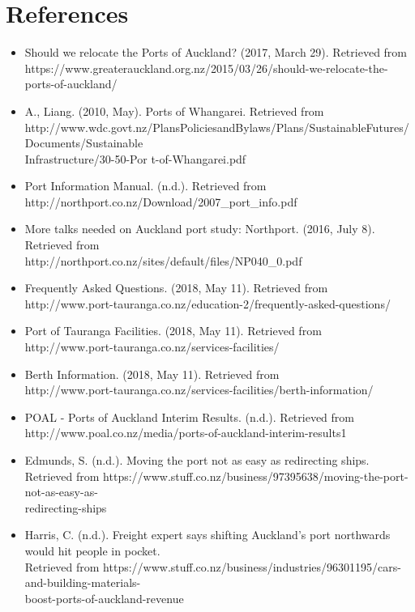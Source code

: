 \newpage
\section{References}

\vspace{5mm}

\begin{itemize}[noitemsep]
    \item Should we relocate the Ports of Auckland? (2017, March 29). Retrieved from \\https://www.greaterauckland.org.nz/2015/03/26/should-we-relocate-the-ports-of-auckland/
    \item A., Liang. (2010, May). Ports of Whangarei. Retrieved from \\http://www.wdc.govt.nz/PlansPoliciesandBylaws/Plans/SustainableFutures/Documents/Sustainable \\Infrastructure/30-50-Por t-of-Whangarei.pdf
    \item Port Information Manual. (n.d.). Retrieved from \\http://northport.co.nz/Download/2007\_port\_info.pdf
    \item More talks needed on Auckland port study: Northport. (2016, July 8). Retrieved from \\http://northport.co.nz/sites/default/files/NP040\_0.pdf
    \item Frequently Asked Questions. (2018, May 11). Retrieved from \\http://www.port-tauranga.co.nz/education-2/frequently-asked-questions/
    \item Port of Tauranga Facilities. (2018, May 11). Retrieved from \\http://www.port-tauranga.co.nz/services-facilities/
    \item Berth Information. (2018, May 11). Retrieved from \\http://www.port-tauranga.co.nz/services-facilities/berth-information/
    \item POAL - Ports of Auckland Interim Results. (n.d.). Retrieved from \\http://www.poal.co.nz/media/ports-of-auckland-interim-results1
    \item Edmunds, S. (n.d.). Moving the port not as easy as redirecting ships. \\Retrieved from https://www.stuff.co.nz/business/97395638/moving-the-port-not-as-easy-as-
    \\redirecting-ships
    \item Harris, C. (n.d.). Freight expert says shifting Auckland's port northwards would hit people in pocket. \\Retrieved from https://www.stuff.co.nz/business/industries/96301195/cars-and-building-materials-\\boost-ports-of-auckland-revenue

\end{itemize}

